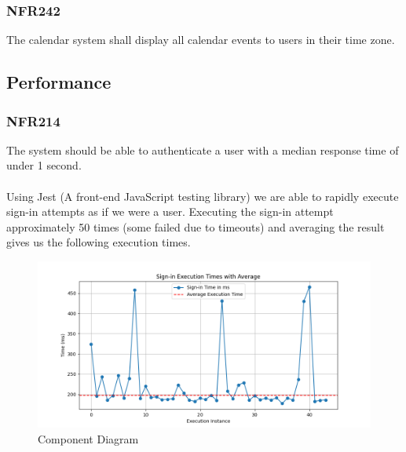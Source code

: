 \documentclass[12pt, titlepage]{article}
\begin{document}
\subsubsection{NFR242}
The calendar system shall display all calendar events to users in
their time zone.
\renewcommand{\arraystretch}{1.5}
\begin{center}
\end{center}

\subsection{Performance}
\subsubsection{NFR214}
The system should be able to authenticate a user with a median
response time of under 1 second.\\\\Using Jest (A front-end JavaScript testing library) we are able to rapidly execute sign-in attempts as if we were a user. Executing the sign-in attempt approximately 50 times (some failed due to timeouts) and averaging the result gives us the following execution times.


\begin{figure}[H]
    \includegraphics[width=\linewidth]{./imgs/signinTimes.png}
    \caption{Component Diagram}
    \label{fig: High level component diagram}
\end{figure}
\end{document}
